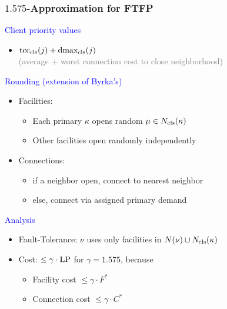 \documentclass[hyperref,dvipsnames,svgnames,compress]{beamer}
\begin{document}
\begin{frame}
\frametitle{$1.575$-Approximation for FTFP}

{\large

\textcolor{blue}{Client priority values}	
	
	\begin{itemize}
		\item $\mbox{\rm{tcc}}_{{\mbox{\scriptsize\rm cls}}}(j) + \mbox{\rm{dmax}}_{{\mbox{\scriptsize\rm cls}}}(j)$
			\\
			{\normalsize \textcolor{gray}{(average + worst connection cost to close neighborhood)}}
	\end{itemize}

\textcolor{blue}{Rounding (extension of Byrka's)}

  	\begin{itemize}
  	  	\item  \textcolor{Sepia}{Facilities:} 
			\begin{itemize}
				\item Each primary $\kappa$ opens random $\mu\in N_{{\mbox{\scriptsize\rm cls}}}(\kappa)$
				\item Other facilities open randomly independently
			\end{itemize}
	  	\item \textcolor{Sepia}{Connections:} 
	 		\begin{itemize}
					\item if a neighbor open, connect to nearest neighbor
					\item else, connect via assigned primary demand
			\end{itemize}
  	\end{itemize}

\textcolor{blue}{Analysis}

  \begin{itemize}
  	\item \textcolor{Sepia}{Fault-Tolerance:} $\nu$ uses only facilities in
	    $N(\nu) \cup N_{{\mbox{\scriptsize\rm cls}}}(\kappa)$
	
  	\item \textcolor{Sepia}{Cost:} $\le \gamma\cdot\mbox{\rm LP}$ for $\gamma = 1.575$, because
    \begin{itemize}
    \item Facility cost $ \leq \gamma\cdot F^\ast$
    \item Connection cost $ \leq \gamma\cdot C^\ast$
    \end{itemize}
\end{itemize}
}

\end{frame}
\end{document}

